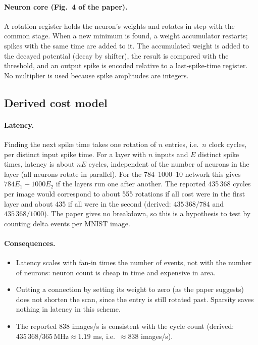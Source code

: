 \paragraph{Neuron core (Fig.~4 of the paper).} A rotation register holds the neuron's weights and rotates in step with the common stage. When a new minimum is found, a weight accumulator restarts; spikes with the same time are added to it. The accumulated weight is added to the decayed potential (decay by shifter), the result is compared with the threshold, and an output spike is encoded relative to a last-spike-time register. No multiplier is used because spike amplitudes are integers.

\subsection{Derived cost model}
\label{sec:costmodel}
\paragraph{Latency.} Finding the next spike time takes one rotation of $n$ entries, i.e.\ $n$ clock cycles, per distinct input spike time. For a layer with $n$ inputs and $E$ distinct spike times, latency is about $nE$ cycles, independent of the number of neurons in the layer (all neurons rotate in parallel). For the 784--1000--10 network this gives $784E_1+1000E_2$ if the layers run one after another. The reported 435\,368 cycles per image would correspond to about 555 rotations if all cost were in the first layer and about 435 if all were in the second (derived: $435\,368/784$ and $435\,368/1000$). The paper gives no breakdown, so this is a hypothesis to test by counting delta events per MNIST image.

\paragraph{Consequences.}
\begin{itemize}[leftmargin=1.5em]
\item Latency scales with fan-in times the number of events, not with the number of neurons: neuron count is cheap in time and expensive in area.
\item Cutting a connection by setting its weight to zero (as the paper suggests) does not shorten the scan, since the entry is still rotated past. Sparsity saves nothing in latency in this scheme.
\item The reported 838 images/s is consistent with the cycle count (derived: $435\,368/365\,\mathrm{MHz}\approx1.19$ ms, i.e.\ $\approx838$ images/s).
\end{itemize}

